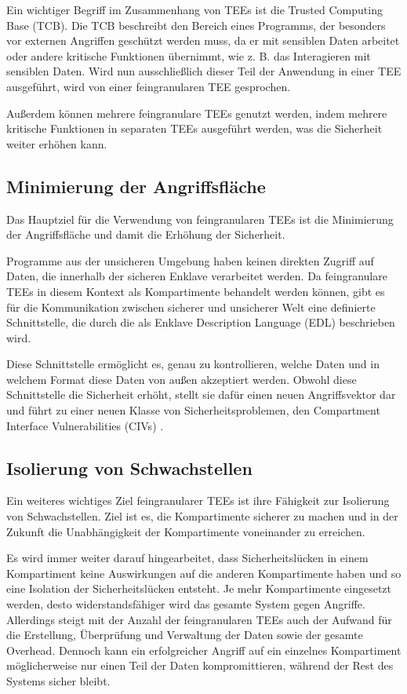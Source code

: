Ein wichtiger Begriff im Zusammenhang von TEEs ist die Trusted Computing Base (TCB). Die TCB beschreibt den Bereich eines Programms, der besonders vor externen Angriffen geschützt werden muss, da er mit sensiblen Daten arbeitet oder andere kritische Funktionen übernimmt, wie z. B. das Interagieren mit sensiblen Daten. Wird nun ausschließlich dieser Teil der Anwendung in einer TEE ausgeführt, wird von einer feingranularen TEE gesprochen.

Außerdem können mehrere feingranulare TEEs genutzt werden, indem mehrere kritische Funktionen in separaten TEEs ausgeführt werden, was die Sicherheit weiter erhöhen kann.

\subsection{Minimierung der Angriffsfläche}
Das Hauptziel für die Verwendung von feingranularen TEEs ist die Minimierung der Angriffsfläche und damit die Erhöhung der Sicherheit. 

Programme aus der unsicheren Umgebung haben keinen direkten Zugriff auf Daten, die innerhalb der sicheren Enklave verarbeitet werden. Da feingranulare TEEs in diesem Kontext als Kompartimente behandelt werden können, gibt es für die Kommunikation zwischen sicherer und unsicherer Welt eine definierte Schnittstelle, die durch die als Enklave Description Language (EDL) beschrieben wird. 

Diese Schnittstelle ermöglicht es, genau zu kontrollieren, welche Daten und in welchem Format diese Daten von außen akzeptiert werden. Obwohl diese Schnittstelle die Sicherheit erhöht, stellt sie dafür einen neuen Angriffsvektor dar und führt zu einer neuen Klasse von Sicherheitsproblemen, den Compartment Interface Vulnerabilities (CIVs) \cite{CIVPaper}.

\subsection{Isolierung von Schwachstellen}
Ein weiteres wichtiges Ziel feingranularer TEEs ist ihre Fähigkeit zur Isolierung von Schwachstellen. Ziel ist es, die Kompartimente sicherer zu machen und in der Zukunft die Unabhängigkeit der Kompartimente voneinander zu erreichen.


Es wird immer weiter darauf hingearbeitet, dass Sicherheitslücken in einem Kompartiment keine Auswirkungen auf die anderen Kompartimente haben und so eine Isolation der Sicherheitslücken entsteht. Je mehr Kompartimente eingesetzt werden, desto widerstandsfähiger wird das gesamte System gegen Angriffe. Allerdings steigt mit der Anzahl der feingranularen TEEs auch der Aufwand für die Erstellung, Überprüfung und Verwaltung der Daten sowie der gesamte Overhead. Dennoch kann ein erfolgreicher Angriff auf ein einzelnes Kompartiment möglicherweise nur einen Teil der Daten kompromittieren, während der Rest des Systems sicher bleibt.
